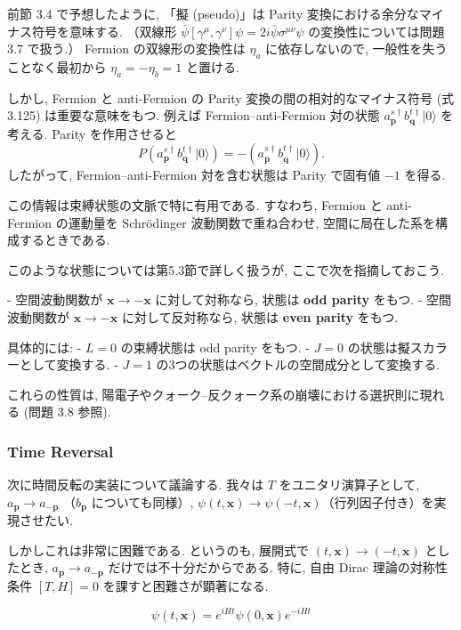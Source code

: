 \documentclass[a4paper,12pt]{article}
\begin{document}
前節 3.4 で予想したように, 「擬 (pseudo)」は Parity 変換における余分なマイナス符号を意味する.  
（双線形 $\bar{\psi}[\gamma^\mu,\gamma^\nu]\psi = 2i\bar{\psi}\sigma^{\mu\nu}\psi$ の変換性については問題 3.7 で扱う.）  
Fermion の双線形の変換性は $\eta_a$ に依存しないので, 一般性を失うことなく最初から $\eta_a=-\eta_b=1$ と置ける.  

しかし, Fermion と anti-Fermion の Parity 変換の間の相対的なマイナス符号 (式 3.125) は重要な意味をもつ.  
例えば Fermion–anti-Fermion 対の状態 $a^{s\dagger}_{\mathbf{p}} b^{t\dagger}_{\mathbf{q}}|0\rangle$ を考える.  
Parity を作用させると
\[
P\left(a^{s\dagger}_{\mathbf{p}} b^{t\dagger}_{\mathbf{q}}|0\rangle\right) 
= -(a^{s\dagger}_{\bar{\mathbf{p}}} b^{t\dagger}_{\bar{\mathbf{q}}}|0\rangle).
\]
したがって, Fermion–anti-Fermion 対を含む状態は Parity で固有値 $-1$ を得る.  

この情報は束縛状態の文脈で特に有用である. すなわち, Fermion と anti-Fermion の運動量を Schrödinger 波動関数で重ね合わせ, 空間に局在した系を構成するときである.  

このような状態については第5.3節で詳しく扱うが, ここで次を指摘しておこう.  

- 空間波動関数が $\mathbf{x}\to-\mathbf{x}$ に対して対称なら, 状態は \textbf{odd parity} をもつ.  
- 空間波動関数が $\mathbf{x}\to-\mathbf{x}$ に対して反対称なら, 状態は \textbf{even parity} をもつ.  

具体的には:  
- $L=0$ の束縛状態は odd parity をもつ.  
- $J=0$ の状態は擬スカラーとして変換する.  
- $J=1$ の3つの状態はベクトルの空間成分として変換する.  

これらの性質は, 陽電子やクォーク–反クォーク系の崩壊における選択則に現れる (問題 3.8 参照).

\subsubsection*{Time Reversal}

次に時間反転の実装について議論する.  
我々は $T$ をユニタリ演算子として, $a_{\mathbf{p}} \to a_{-\mathbf{p}}$ （$b_{\mathbf{p}}$ についても同様）,  
$\psi(t,\mathbf{x}) \to \psi(-t,\mathbf{x})$（行列因子付き）を実現させたい.  

しかしこれは非常に困難である.  
というのも, 展開式で $(t,\mathbf{x}) \to (-t,\mathbf{x})$ としたとき, $a_{\mathbf{p}} \to a_{-\mathbf{p}}$ だけでは不十分だからである.  
特に, 自由 Dirac 理論の対称性条件 $[T,H]=0$ を課すと困難さが顕著になる.  

\begin{equation*}
\psi(t,\mathbf{x}) = e^{iHt}\psi(0,\mathbf{x})e^{-iHt}
\end{equation*}
\end{document}
